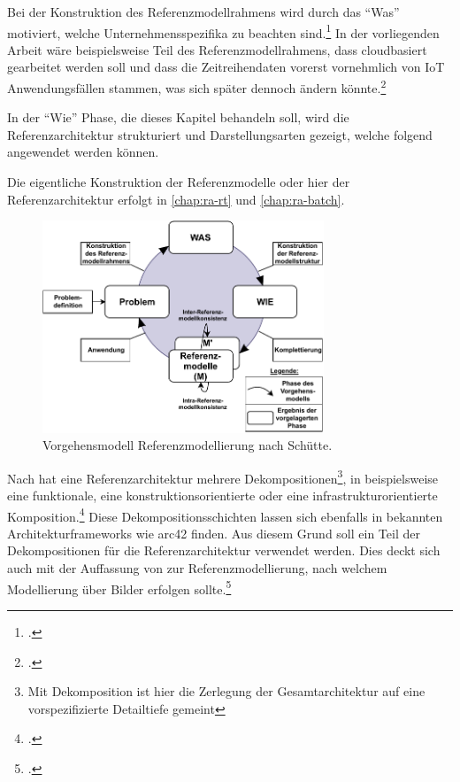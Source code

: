 Bei der Konstruktion des Referenzmodellrahmens wird durch das \enquote{Was} motiviert, welche Unternehmensspezifika zu beachten sind.\footcite[Vgl. auch im Folgenden][186]{Schutte.1998} In der vorliegenden Arbeit wäre beispielsweise Teil des Referenzmodellrahmens, dass cloudbasiert gearbeitet werden soll und dass die Zeitreihendaten vorerst vornehmlich von \ac{IoT} Anwendungsfällen stammen, was sich später dennoch ändern könnte.\footcite[Vgl. auch im Folgenden][187\psq]{Schutte.1998} 

In der \enquote{Wie} Phase, die dieses Kapitel behandeln soll, wird die Referenzarchitektur strukturiert und Darstellungsarten gezeigt, welche folgend angewendet werden können. 

Die eigentliche Konstruktion der Referenzmodelle oder hier der Referenzarchitektur erfolgt in \autoref{chap:ra-rt} und \autoref{chap:ra-batch}.

\begin{figure}[H]
\centering
\includegraphics[width=0.75\textwidth]{graphics/Vorgehen-Referenzmodellierung.pdf}
\caption[Vorgehensmodell Referenzmodellierung nach Schütte]{Vorgehensmodell Referenzmodellierung nach Schütte.\footnotemark}
\label{abb:VorgehensmodellReferenzmodellierung}
\end{figure}

Nach \citeauthor{Muller.2020} hat eine Referenzarchitektur mehrere Dekompositionen\footnote{Mit Dekomposition ist hier die Zerlegung der Gesamtarchitektur auf eine vorspezifizierte Detailtiefe gemeint}, in beispielsweise eine funktionale, eine konstruktionsorientierte oder eine infrastrukturorientierte Komposition.\footcite[Vgl.][7]{Muller.2020} Diese Dekompositionsschichten lassen sich ebenfalls in bekannten Architekturframeworks wie arc42 finden. Aus diesem Grund soll ein Teil der Dekompositionen für die Referenzarchitektur verwendet werden. Dies deckt sich auch mit der Auffassung von \citeauthor{Schutte.1998} zur Referenzmodellierung, nach welchem Modellierung über Bilder erfolgen sollte.\footcite[Vgl.][185]{Schutte.1998}

